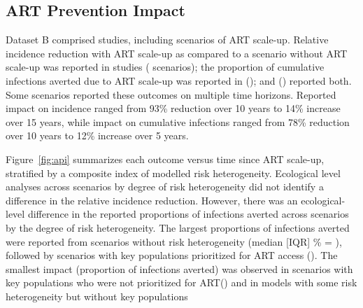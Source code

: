 \subsection{ART Prevention Impact}
\label{ss:res:api}
Dataset B comprised  studies,
including  scenarios of ART scale-up.
Relative incidence reduction with ART scale-up
as compared to a scenario without ART scale-up
was reported in  studies ( scenarios);
the proportion of cumulative infections averted due to ART scale-up
was reported in  ();
and  () reported both.
Some scenarios reported these outcomes on multiple time horizons.
Reported impact on incidence ranged from %
93\% reduction over 10 years\cite{Granich2009} to
14\% increase over 15 years,\cite{Salomon2005}
while impact on cumulative infections ranged from
78\% reduction over 10 years\cite{Abbas2006} to
12\% increase over 5 years.\cite{Barnighausen2016}
\par
Figure~\ref{fig:api} summarizes each outcome versus time since ART scale-up,
stratified by a composite index of modelled risk heterogeneity.
Ecological level analyses across scenarios by degree of risk heterogeneity
did not identify a difference in the relative incidence reduction. %
However, there was an ecological-level difference in  %
the reported proportions of infections averted across
scenarios by the degree of risk heterogeneity. %
The largest proportions of infections averted were reported from 
scenarios without risk heterogeneity 
(median [IQR] \% = ), followed by scenarios 
with key populations prioritized for ART access ().
The smallest impact (proportion of infections averted) was observed in 
scenarios with key populations who were not prioritized for ART()
and in models with some risk heterogeneity but without key populations
